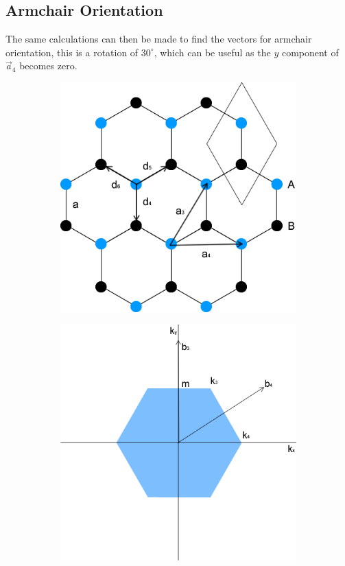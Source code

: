 		\subsection{Armchair Orientation}
		\label{Introduction - Armchair Orientation}
			The same calculations can then be made to find the vectors for armchair orientation, this is a rotation of $30^{\circ}$, which can be useful as the $y$ component of $\vec{a}_{4}$ becomes zero.
			\begin{figure}[h]
				 \begin{subfigure}[h]{0.47\textwidth}
					\centerline{\includegraphics[scale=0.5]{images/strucure-arm-flat}}
					\caption{}
				\end{subfigure}
				\hspace{1cm}
				\begin{subfigure}[h]{0.47\textwidth}
					\centerline{\includegraphics[scale=0.43]{images/strucure-bz-arm-flat}}

\end{subfigure}
\end{figure}
